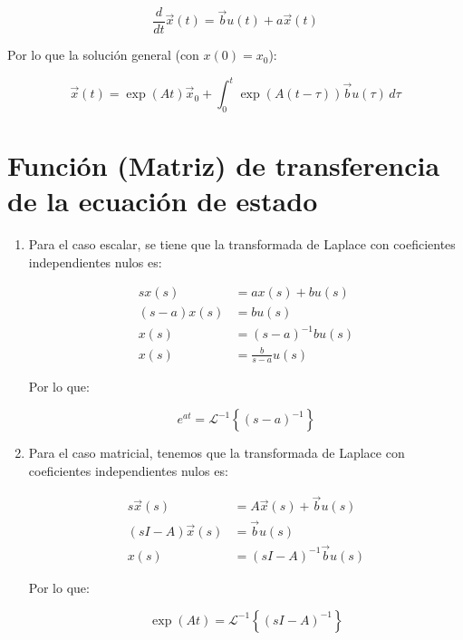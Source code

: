 \begin{enumerate}
        \begin{equation}
            \frac{d}{dt} \vec{x}(t) = \vec{b} u(t) + a \vec{x}(t)
        \end{equation}

        Por lo que la solución general (con $x(0) = x_0$):

        \begin{equation}
            \vec{x}(t) = \exp{(At)} \vec{x}_0 + \int_0^t \exp{(A(t-\tau))} \vec{b} u(\tau) \, d \tau
        \end{equation}

    \end{enumerate}


    \newpage
    \section{Función (Matriz) de transferencia de la ecuación de estado}

        \begin{enumerate}

        \item
        Para el caso escalar, se tiene que la transformada de Laplace con coeficientes independientes nulos es:

        \begin{align}
        s x(s)       & = a x(s) + b u(s) \nonumber\\
        (s - a) x(s) & = b u(s) \nonumber\\
        x(s)         & = (s - a)^{-1} b u(s) \nonumber\\
        x(s)         & = \frac{b}{s - a} u(s) \nonumber
        \end{align}

        Por lo que:

        \begin{equation}
        e^{at} = \mathcal{L}^{-1} \left\{ (s - a)^{-1} \right\}
        \end{equation}

        \item
        Para el caso matricial, tenemos que la transformada de Laplace con coeficientes independientes nulos es:

        \begin{align}
        s \vec{x}(s)         & = A \vec{x}(s) + \vec{b} u(s) \nonumber \\
        (s I - A) \vec{x}(s) & = \vec{b} u(s) \nonumber \\
        x(s)                 & = (s I - A)^{-1} \vec{b} u(s) \nonumber
        \end{align}

        Por lo que:

        \begin{equation}
        \exp{(At)} = \mathcal{L}^{-1} \left\{ (s I - A)^{-1} \right\}
        \end{equation}

        \end{enumerate}

